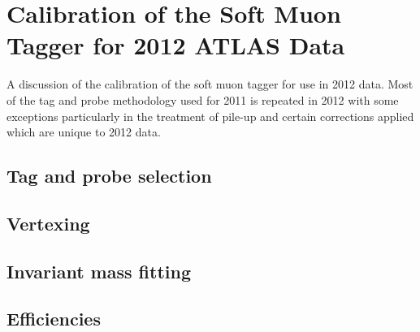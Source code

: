 \chapter{Calibration of the Soft Muon Tagger for 2012 ATLAS Data} \label{prt:calibration_smt_2012}
A discussion of the calibration of the soft muon tagger for use in 2012 data.
Most of the tag and probe methodology used for 2011 is repeated in 2012 with some 
exceptions particularly in the treatment of pile-up and certain corrections applied
which are unique to 2012 data.

\section{Tag and probe selection} \label{sec:selection_criteria}
\section{Vertexing} \label{sec:vertexing}
\section{Invariant mass fitting} \label{sec:fitting}
\section{Efficiencies} \label{sec:efficiencies}
